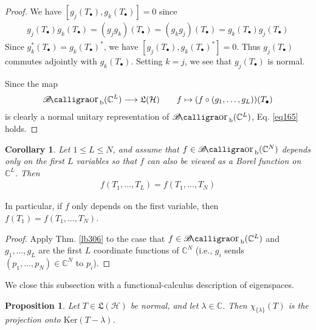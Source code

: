 \documentclass[12pt,b5paper,notitlepage]{article}
\theoremstyle{definition}
\theoremstyle{plain}
\newtheorem{pp}[df]{Proposition}
\newtheorem{co}[df]{Corollary}
\DeclareMathOperator{\Borb}{{\mathscr{B}\text{\kern -2pt {\calligra\large or}}\,}_{\mathrm b}}
\newcommand{\fk}{\mathfrak}
\newcommand{\blt}{\bullet}
\newcommand{\Cbb}{\mathbb C}
\newcommand{\Ker}{\mathrm{Ker}}
\newcommand{\MH}{\mathcal H}
\numberwithin{equation}{section}
\begin{document}
\begin{proof}
We have $[g_j(T_\blt),g_k(T_\blt)]=0$ since
\begin{align*}
g_j(T_\blt)g_k(T_\blt)=(g_jg_k)(T_\blt)=(g_kg_j)(T_\blt)=g_k(T_\blt)g_j(T_\blt)
\end{align*}
Since $g_k^*(T_\blt)=g_k(T_\blt)^*$, we have $[g_j(T_\blt),g_k(T_\blt)^*]=0$. Thus $g_j(T_\blt)$ commutes adjointly with $g_k(T_\blt)$. Setting $k=j$, we see that $g_j(T_\blt)$ is normal. 

Since the map
\begin{align*}
\Borb(\Cbb^L)\longrightarrow\fk L(\MH)\qquad f\mapsto (f\circ(g_1,\dots,g_L))(T_\blt)
\end{align*}
is clearly a normal unitary representation of $\Borb(\Cbb^L)$, Eq. \eqref{eq165} holds.
\end{proof}


\begin{co}\label{lb308}
Let $1\leq L\leq N$, and assume that $f\in\Borb(\Cbb^N)$ depends only on the first $L$ variables so that $f$ can also be viewed as a Borel function on $\Cbb^L$. Then
\begin{align*}
f(T_1,\dots,T_L)=f(T_1,\dots,T_N)
\end{align*} 
\end{co}

In particular, if $f$ only depends on the first variable, then $f(T_1)=f(T_1,\dots,T_N)$.

\begin{proof}
Apply Thm. \ref{lb306} to the case that $f\in\Borb(\Cbb^L)$ and $g_1,\dots,g_L$ are the first $L$ coordinate functions of $\Cbb^N$ (i.e., $g_i$ sends $(p_1,\dots,p_N)\in\Cbb^N$ to $p_i$).
\end{proof}



We close this subsection with a functional-calculus description of eigenspaces.

\begin{pp}\label{lb317}
Let $T\in\fk L(\MH)$ be normal, and let $\lambda\in\Cbb$. Then $\chi_{\{\lambda\}}(T)$ is the projection onto $\Ker(T-\lambda)$.
\end{pp}
\end{document}
